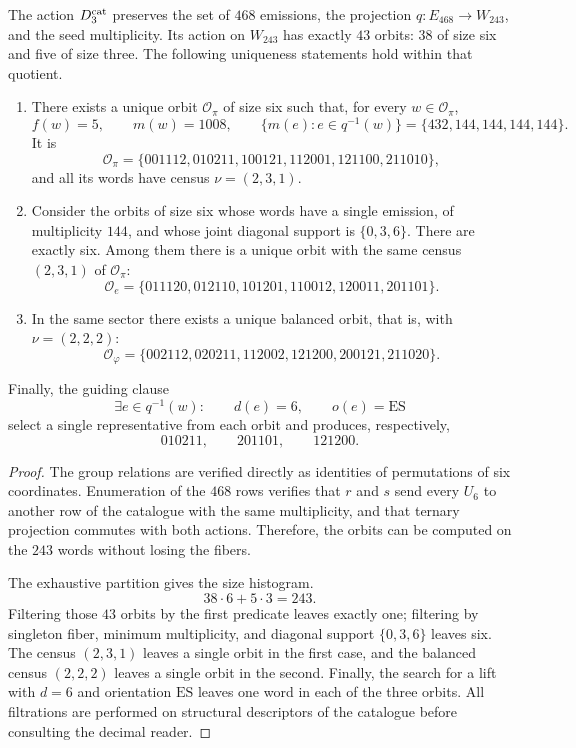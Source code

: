 \begin{theorem}
\label{thm:selector-orbital-constantes}
The action \(D_3^{\rm cat}\) preserves the set of \(468\) emissions, the
projection \(q:E_{468}\to W_{243}\), and the seed multiplicity. Its action on
\(W_{243}\) has exactly \(43\) orbits: \(38\) of size six and
five of size three. The following uniqueness statements hold within that
quotient.

\begin{enumerate}
\item There exists a unique orbit \(\mathcal O_\pi\) of size six such that, for
every \(w\in\mathcal O_\pi\),
\[
 f(w)=5,
 \qquad m(w)=1008,
 \qquad
 \{m(e):e\in q^{-1}(w)\}=\{432,144,144,144,144\}.
\]
It is
\[
\mathcal O_\pi=
\{001112,010211,100121,112001,121100,211010\},
\]
and all its words have census \(\nu=(2,3,1)\).

\item Consider the orbits of size six whose words have a single
emission, of multiplicity \(144\), and whose joint diagonal support is
\(\{0,3,6\}\). There are exactly six. Among them there is a unique orbit
with the same census \((2,3,1)\) of \(\mathcal O_\pi\):
\[
\mathcal O_e=
\{011120,012110,101201,110012,120011,201101\}.
\]

\item In the same sector there exists a unique balanced orbit, that is, with
\(\nu=(2,2,2)\):
\[
\mathcal O_\varphi=
\{002112,020211,112002,121200,200121,211020\}.
\]
\end{enumerate}

Finally, the guiding clause
\begin{equation}
 \exists e\in q^{-1}(w):
 \qquad d(e)=6,
 \qquad o(e)=\mathrm{ES}
 \label{eq:gauge-orbital-constantes}
\end{equation}
select a single representative from each orbit and produces, respectively,
\[
 \boxed{010211,\qquad201101,\qquad121200.}
\]
\end{theorem}

\begin{proof}
The group relations are verified directly as identities of permutations of six
coordinates. Enumeration of the \(468\) rows
verifies that \(r\) and \(s\) send every \(U_6\) to another row of the catalogue with
the same multiplicity, and that ternary projection commutes with both actions.
Therefore, the orbits can be computed on the \(243\) words without losing the
fibers.

The exhaustive partition gives the size histogram.
\[
 38\cdot6+5\cdot3=243.
\]
Filtering those \(43\) orbits by the first predicate leaves exactly one;
filtering by singleton fiber, minimum multiplicity, and diagonal support
\(\{0,3,6\}\) leaves six. The census \((2,3,1)\) leaves a single orbit in the
first case, and the balanced census \((2,2,2)\) leaves a single orbit in the second.
Finally, the search for a lift with \(d=6\) and orientation
\(\mathrm{ES}\) leaves one word in each of the three orbits. All
filtrations are performed on structural descriptors of the catalogue before consulting the
decimal reader.
\end{proof}

